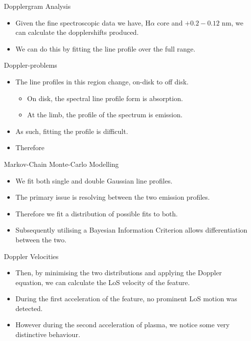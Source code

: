 \documentclass{beamer}
\begin{document}
	\begin{frame}{Dopplergram Analysis}
		\begin{itemize}
			\item{Given the fine spectroscopic data we have, H$\alpha$ core and $+0.2 -0.12$ nm, we can calculate the dopplershifts produced.}
			\item{We can do this by fitting the line profile over the full range.}
		\end{itemize}
	\end{frame}
	
	\begin{frame}
	\end{frame}

	\begin{frame}{Doppler-problems}
		\begin{itemize}
			\item{The line profiles in this region change, on-disk to off disk.}
			\begin{itemize}
				\item{On disk, the spectral line profile form is absorption.}
				\item{At the limb, the profile of the spectrum is emission.}
			\end{itemize}
			\item{As such, fitting the profile is difficult.}
			\item{Therefore}
		\end{itemize}
	\end{frame}
	
	\begin{frame}
		\big{Markov-Chain Monte-Carlo}
	\end{frame}
	
	
	\begin{frame}{Markov-Chain Monte-Carlo Modelling}
		\begin{itemize}
			\item{We fit both single and double Gaussian line profiles.}
			\item{The primary issue is resolving between the two emission profiles.}
			\item{Therefore we fit a distribution of possible fits to both.}
			\item{Subsequently utilising a Bayesian Information Criterion allows differentiation between the two.}
		\end{itemize}
	\end{frame}

	\begin{frame}{Doppler Velocities}
		\begin{itemize}
			\item{Then, by minimising the two distributions and applying the Doppler equation, we can calculate the LoS velocity of the feature.}
			\item{During the first acceleration of the feature, no prominent LoS motion was detected.}
			\item{However during the second acceleration of plasma, we notice some very distinctive behaviour.}
		\end{itemize}
	\end{frame}
\end{document}
